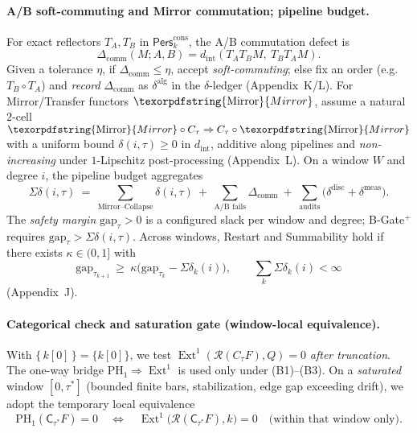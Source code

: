 \documentclass[11pt]{article}
\numberwithin{equation}{section}
\theoremstyle{plain}
\theoremstyle{definition}
\theoremstyle{remark}
\DeclareMathOperator{\Ext}{Ext}
\DeclareRobustCommand{\hyp}{\nobreakdash-}
\newcommand{\Pers}{\mathsf{Pers}}
\newcommand{\C}{\mathsf{C}}
\theoremstyle{plain}
\theoremstyle{definition}
\numberwithin{equation}{section}
\theoremstyle{definition}
\DeclareRobustCommand{\Perskft}{\Pers^{\mathrm{cons}}_{k}}
\DeclareRobustCommand{\Qtest}{\{\,k[0]\,\}}
\DeclareRobustCommand{\Mirror}{\texorpdfstring{\ensuremath{\operatorname{Mirror}}}{Mirror}}
\numberwithin{equation}{section}
\theoremstyle{plain}
\theoremstyle{definition}
\theoremstyle{remark}
\begin{document}
\paragraph{A/B soft\hyp commuting and Mirror commutation; pipeline budget.}
For exact reflectors \(T_A,T_B\) in \(\Perskft\), the A/B commutation defect is
\[
\Delta_{\mathrm{comm}}(M;A,B)=d_{\mathrm{int}}(T_AT_BM,\ T_BT_AM).
\]
Given a tolerance \(\eta\), if \(\Delta_{\mathrm{comm}}\le\eta\), accept \emph{soft\hyp commuting}; else fix an order (e.g.\ \(T_B\circ T_A\)) and \emph{record} \(\Delta_{\mathrm{comm}}\) as \(\delta^{\mathrm{alg}}\) in the \(\delta\)\hyp ledger (Appendix~K/L).
For Mirror/Transfer functors \(\Mirror\), assume a natural \(2\)\hyp cell \(\Mirror\circ C_\tau\Rightarrow C_\tau\circ\Mirror\) with a uniform bound \(\delta(i,\tau)\ge 0\) in \(d_{\mathrm{int}}\), additive along pipelines and \emph{non\hyp increasing} under \(1\)\hyp Lipschitz post\hyp processing (Appendix~L).
On a window \(W\) and degree \(i\), the pipeline budget aggregates
\[
\Sigma\delta(i,\tau)\ =\ \sum_{\text{Mirror--Collapse}}\delta(i,\tau)\ +\ \sum_{\text{A/B fails}}\Delta_{\mathrm{comm}}\ +\ \sum_{\text{audits}}\bigl(\delta^{\mathrm{disc}}+\delta^{\mathrm{meas}}\bigr).
\]
The \emph{safety margin} \(\mathrm{gap}_\tau>0\) is a configured slack per window and degree; B\hyp Gate\(^{+}\) requires \(\mathrm{gap}_\tau>\Sigma\delta(i,\tau)\). Across windows, Restart and Summability hold if there exists \(\kappa\in(0,1]\) with
\[
\mathrm{gap}_{\tau_{k+1}}\ \ge\ \kappa\bigl(\mathrm{gap}_{\tau_k}-\Sigma\delta_k(i)\bigr),\qquad \sum_k \Sigma\delta_k(i)<\infty
\]
(Appendix~J).

\paragraph{Categorical check and saturation gate (window\hyp local equivalence).}
With \(\Qtest=\{k[0]\}\), we test \(\Ext^1(\mathcal{R}(C_\tau F),Q)=0\) \emph{after truncation}.
The one\hyp way bridge \(\mathrm{PH}_1\Rightarrow \Ext^1\) is used only under (B1)–(B3).
On a \emph{saturated} window \([0,\tau^\ast]\) (bounded finite bars, stabilization, edge gap exceeding drift), we adopt the temporary local equivalence
\[
\mathrm{PH}_1(\C_{\tau^\ast}F)=0\quad\Longleftrightarrow\quad \Ext^1\bigl(\mathcal{R}(\C_{\tau^\ast}F),k\bigr)=0\quad\text{(within that window only)}.
\]
\end{document}
